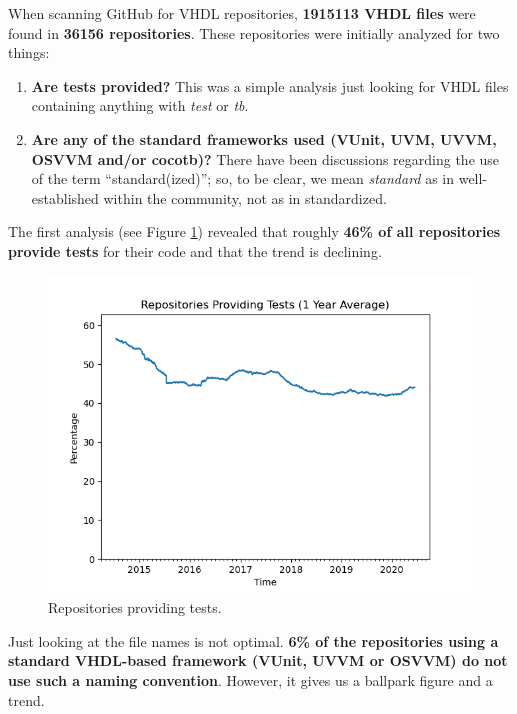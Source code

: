 \documentclass[]{article}
\providecommand{\tightlist}{%
  \setlength{\itemsep}{0pt}\setlength{\parskip}{0pt}}
\begin{document}
When scanning GitHub for VHDL repositories, \textbf{1915113 VHDL files} were found in \textbf{36156 repositories}. These repositories were initially analyzed for two things:

\begin{enumerate}
\def\labelenumi{\arabic{enumi}.}
\tightlist
\item
  \textbf{Are tests provided?} This was a simple analysis just looking for VHDL files containing anything with \emph{test} or \emph{tb}.
\item
  \textbf{Are any of the standard frameworks used (VUnit, UVM, UVVM, OSVVM and/or cocotb)?} There have been discussions regarding the use of the term ``standard(ized)''; so, to be clear, we mean \emph{standard} as in well-established within the community, not as in standardized.
\end{enumerate}

The first analysis (see Figure \ref{fig:repositories}) revealed that roughly \textbf{46\% of all repositories provide tests} for their code and that the trend is declining.

\begin{figure}

{\centering \includegraphics[width=0.85\linewidth]{img/repositories_providing_tests} 

}

\caption{Repositories providing tests.}\label{fig:repositories}
\end{figure}

Just looking at the file names is not optimal. \textbf{6\% of the repositories using a standard VHDL-based framework (VUnit, UVVM or OSVVM) do not use such a naming convention}. However, it gives us a ballpark figure and a trend.
\end{document}
